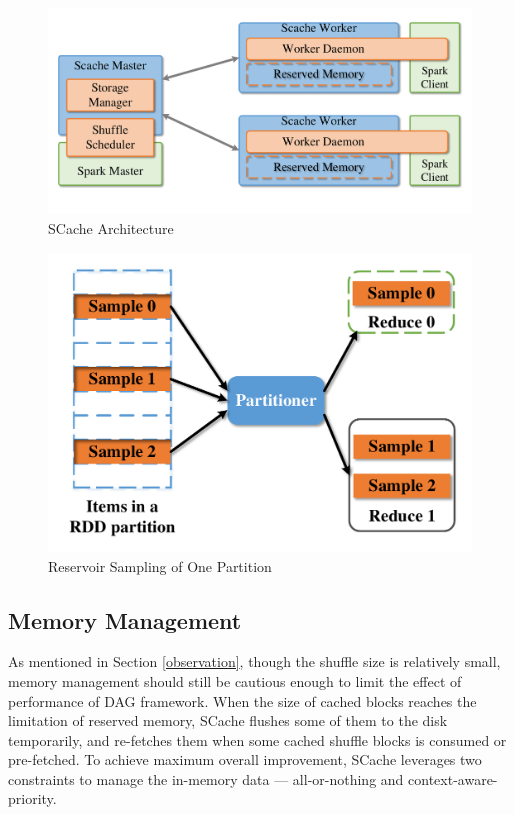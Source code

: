 \begin{figure}
	\centering
	\includegraphics[width=0.8\linewidth]{fig/arch}
	\caption{SCache Architecture}
	\label{fig:arch}
	\vspace{-1em}
\end{figure}
\begin{figure}
	\centering
	\includegraphics[width=0.6\linewidth]{fig/sample}
	\caption{Reservoir Sampling of One Partition}
	\label{fig:sample}
	\vspace{-1em}
\end{figure}
\subsection{Memory Management}\label{memorymanage}
As mentioned in Section \ref{observation}, though the shuffle size is relatively small, memory management should still be cautious enough to limit the effect of performance of DAG framework.
When the size of cached blocks reaches the limitation of reserved memory, SCache flushes some of them to the disk temporarily, and re-fetches them when some cached shuffle blocks is consumed or pre-fetched. To achieve maximum overall improvement, SCache leverages two constraints to manage the in-memory data --- all-or-nothing and context-aware-priority.

